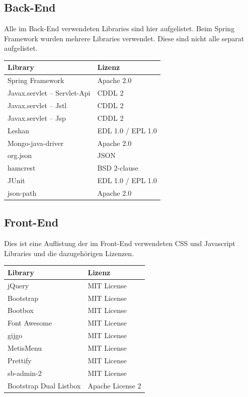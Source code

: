 \subsection{Back-End}
Alle im Back-End verwendeten Libraries sind hier aufgelistet. Beim Spring Framework wurden mehrere Libraries verwendet. Diese sind nicht alle separat aufgelistet. 
\begin{table}[H]
\begin{tabular}{|l|l|}
\hline 
\textbf{Library} & \textbf{Lizenz} \\ 
\hline 
Spring Framework
 & Apache 2.0
 \\ 
\hline 
Javax.servlet – Servlet-Api
 & CDDL 2 \\ 
\hline 
Javax.servlet – Jstl & CDDL 2 \\ 
\hline 
Javax.servlet – Jsp & CDDL 2 \\ 
\hline 
Leshan & EDL 1.0 / EPL 1.0 \\ 
\hline 
Mongo-java-driver & Apache 2.0 \\ 
\hline 
org.json & JSON \\ 
\hline 
hamcrest & BSD 2-clause \\ 
\hline 
JUnit & EDL 1.0 / EPL 1.0 \\ 
\hline 
json-path & Apache 2.0 \\  \hline
\end{tabular} 
\end{table}

\subsection{Front-End}
Dies ist eine Auflistung der im Front-End verwendeten CSS und Javascript Libraries und die dazugehörigen Lizenzen. 
\begin{table}[H]
\begin{tabular}{|l|l|}
\hline 
\textbf{Library} & \textbf{Lizenz} \\ 
\hline 
jQuery	&	MIT License	 \\ \hline
Bootstrap	&	MIT License	 \\ \hline
Bootbox	&	MIT License	 \\ \hline
Font Awesome	&	MIT License	 \\ \hline
gijgo	&	MIT License	 \\ \hline
MetisMenu	&	MIT License	 \\ \hline
Prettify	&	MIT License	 \\ \hline
sb-admin-2	&	MIT License	 \\ \hline
Bootstrap Dual Listbox	&	Apache License 2	 \\ \hline
\end{tabular} 
\end{table}
\newpage

